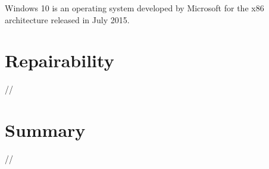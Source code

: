Windows 10 is an operating system developed by Microsoft for the x86 architecture released in July 2015.


\section{Repairability}

//


\section{Summary}

//